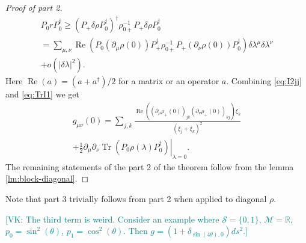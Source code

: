 \documentclass[
  american,aps,pra,reprint,floatfix,nofootinbib,superscriptaddress
]{revtex4-2}
\DeclareMathOperator{\Tr}{Tr}
\DeclareMathOperator{\real}{Re}
\newcommand{\abs}[1]{\left|#1\right|}
\newcommand{\VK}[1]{\textcolor{teal}{[VK: #1]}}
\begin{document}
\begin{proof}[Proof of part 2]
  \begin{multline}
    P_0 r P_0^{\dagger}
    \geq \left(P_{+} \delta\rho P_0^{\dagger}\right)^{\dagger}
    \rho_{0{+}}^{-1} P_{+} \delta\rho P_0^{\dagger} \\
    = \sum_{\mu,\nu} \real\left(
        P_0 \left(\partial_\mu\rho(0)\right)
        P_{+}^{\dagger} \rho_{0{+}}^{-1}
        P_{+} \left(\partial_\nu\rho(0)\right) P_0^{\dagger}
      \right)
      \delta\lambda^\mu \delta\lambda^\nu \\
    + o(\abs{\delta \lambda}^2).
  \end{multline}
  Here $\real(a) = (a + a^{\dagger}) / 2$ for a matrix or an operator $a$.
  Combining \eqref{eq:I2jj} and \eqref{eq:TrI1} we get
  \begin{multline}
    g_{\mu\nu}(0)
    = \sum_{j,k} \frac{
        \real\left(
          (\partial_\mu\rho_{+}(0))_{jk}
          (\partial_\nu\rho_{+}(0))_{kj}
        \right) \xi_k
      }{(\xi_j + \xi_k)^2}\\
    + \frac12 \left.\partial_\mu \partial_\nu \Tr(P_0 \rho(\lambda)
    P_0^{\dagger}) \right|_{\lambda=0}.
  \end{multline}
  The remaining statements of the part 2 of the theorem follow from the
  lemma \ref{lm:block-diagonal}.
\end{proof}
Note that part 3 trivially follows from part 2 when applied to diagonal $\rho$.

\VK{The third term is weird.
Consider an example where $\mathcal{S} = \{0, 1\}$, $\mathcal{M} = \mathbb{R}$,
$p_0 = \sin^2(\theta)$, $p_1 = \cos^2(\theta)$. Then $g = (1 + \delta_{\sin(4\theta),0}) ds^2$.}
\end{document}
